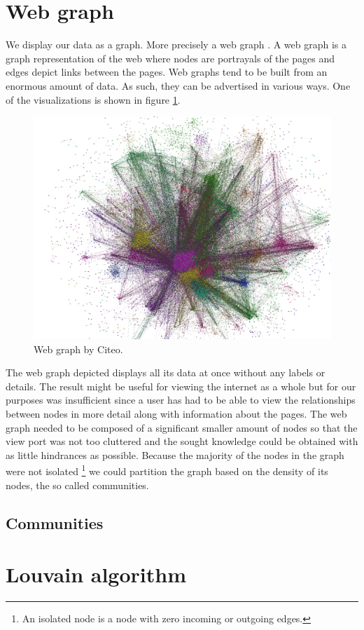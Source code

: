\section{Web graph} \label{webGraph}
We display our data as a graph. More precisely a web graph \cite{the_web_graph_overview}. A web graph is a graph representation of the web where nodes are portrayals of the pages and edges depict links between the pages. Web graphs tend to be built from an enormous amount of data. As such, they can  be advertised in various ways. One of the visualizations is shown in figure  \ref{hugeWebGraphFireworks}. 
\begin{figure}[ht!]
  \centering
  \includegraphics[width=\textwidth]{Images/hugeWebGraphFireworks.png}
  \caption{Web graph by Citeo.}
  \label{hugeWebGraphFireworks}
\end{figure} 
The web graph depicted displays all its data at once without any labels or details. The result might be useful for viewing the internet as a whole but for our purposes was insufficient since a user has had to be able to view the relationships between nodes in more detail along with information about the pages. The web graph needed to be composed of a significant smaller amount of nodes so that the view port was not too cluttered and the sought knowledge could be obtained with as little hindrances as possible. Because the majority of the nodes in the graph were not isolated \footnote{An isolated node is a node with zero incoming or outgoing edges.} we could partition the graph based on the density of its nodes, the so called communities.
\subsection{Communities}

\section{Louvain algorithm} \label{louvainAlgorithm}



